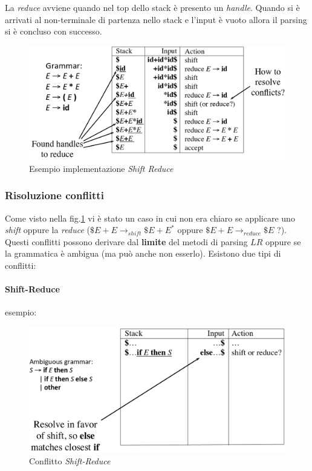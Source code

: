 La \textit{reduce} avviene quando nel top dello stack \`e presento un
\textit{handle}. Quando si \`e arrivati al non-terminale di partenza nello stack
e l'input \`e vuoto allora il parsing si \`e concluso con successo.

\begin{figure}[H]
\begin{center}
\includegraphics[scale=0.3]{res/image/shift_reduce_stack}
\caption{Esempio implementazione \textit{Shift Reduce}}
\label{img:shift_reduce_stack}
\end{center}
\end{figure}

\subsubsection{Risoluzione conflitti}
\label{sec:risoluzione_conflitti}
Come visto nella fig.\ref{img:shift_reduce_stack} vi \`e stato un caso in cui
non era chiaro se applicare uno \textit{shift} oppure la \textit{reduce}
($\$E+E \to_{shift} \$E+E^* \text{ oppure } \$E+E \to_{reduce} \$E$ ?). Questi
conflitti possono derivare dal \textbf{limite} del metodi di parsing $LR$ oppure
se la grammatica \`e ambigua (ma pu\`o anche non esserlo). Esistono due tipi
di conflitti:

\paragraph{Shift-Reduce}
esempio:
\begin{figure}[H]
\begin{center}
\includegraphics[scale=0.4]{res/image/shift-reduce}
\caption{Conflitto \textit{Shift-Reduce}}
\label{img:shift-reduce}
\end{center}
\end{figure}

